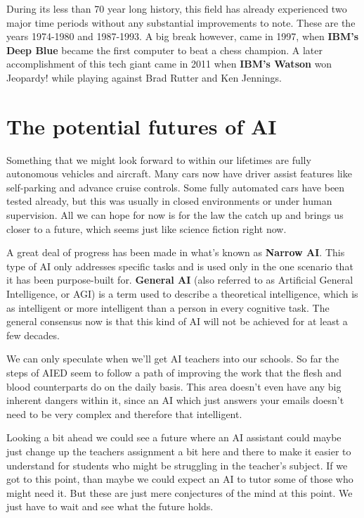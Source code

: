 \documentclass[10pt,a4paper,]{article}
\begin{document}
During its less than 70 year long history, this field has already experienced two major time periods without any substantial improvements to note. These are the years 1974-1980 and 1987-1993. A big break however, came in 1997, when \textbf{IBM's Deep Blue} became the first computer to beat a chess champion. A later accomplishment of this tech giant came in 2011 when \textbf{IBM's Watson} won Jeopardy! while playing against Brad Rutter and Ken Jennings.\cite{USA2016}

\section{The potential futures of AI} \label{future}

Something that we might look forward to within our lifetimes are fully autonomous vehicles and aircraft. Many cars now have driver assist features like self-parking and advance cruise controls. Some fully automated cars have been tested already, but this was usually in closed environments or under human supervision. All we can hope for now is for the law the catch up and brings us closer to a future, which seems just like science fiction right now.\cite{USA2016}

A great deal of progress has been made in what's known as \textbf{Narrow AI}. This type of AI only addresses specific tasks and is used only in the one scenario that it has been purpose-built for. \textbf{General AI} (also referred to as Artificial General Intelligence, or AGI) is a term used to describe a theoretical intelligence, which is as intelligent or more intelligent than a person in every cognitive task. The general consensus now is that this kind of AI will not be achieved for at least a few decades.\cite{USA2016}

We can only speculate when we'll get AI teachers into our schools. So far the steps of AIED seem to follow a path of improving the work that the flesh and blood counterparts do on the daily basis. This area doesn't even have any big inherent dangers within it, since an AI which just answers your emails doesn't need to be very complex and therefore that intelligent.

Looking a bit ahead we could see a future where an AI assistant could maybe just change up the teachers assignment a bit here and there to make it easier to understand for students who might be struggling in the teacher's subject. If we got to this point, than maybe we could expect an AI to tutor some of those who might need it. But these are just mere conjectures of the mind at this point. We just have to wait and see what the future holds.
\end{document}
